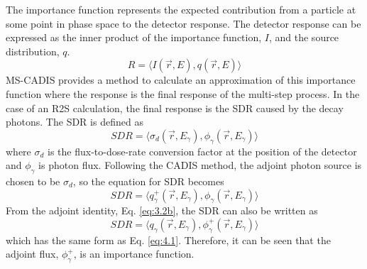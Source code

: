 The importance function represents the expected contribution from a particle 
at some point in phase space to the detector response.
The detector response can be
expressed as the inner product of the importance function, $I$, and the source
distribution, $q$.
\begin{equation} \label{eq:4.1}
R = %
    \langle I(\overrightarrow{r}, E), 
    q(\overrightarrow{r}, E) \rangle
\end{equation}
MS-CADIS provides a method to calculate an
 approximation 
of this importance function
where the response is the final response of the multi-step process.  In the case
of an R2S calculation, the final response is the SDR caused by the decay
photons.  The SDR is defined as 
\begin{equation} \label{eq:4.2}
  SDR =  \langle \sigma_{d}(\overrightarrow{r},E_{\gamma}),
  \phi_{\gamma}(\overrightarrow{r}, E_{\gamma}) \rangle
\end{equation}
where $\sigma_{d}$ is the flux-to-dose-rate conversion factor at the position of
the detector and $\phi_{\gamma}$ is photon flux.
Following the CADIS method, the adjoint photon source is chosen to be $\sigma_d$,
so the equation for SDR becomes 
\begin{equation} \label{eq:4.2.1}
	SDR =  \langle q_{\gamma}^{+}(\overrightarrow{r},E_{\gamma}),
                       \phi_{\gamma}(\overrightarrow{r}, E_{\gamma}) \rangle 
\end{equation}
From the adjoint identity, Eq. \ref{eq:3.2b}, the SDR can also be written as 
\begin{equation} \label{eq:4.3}
	SDR =
	\langle q_{\gamma}(\overrightarrow{r},E_{\gamma}),
  \phi_{\gamma}^{+}(\overrightarrow{r}, E_{\gamma}) \rangle 
\end{equation}
which has the same form as Eq. \ref{eq:4.1}.  Therefore, it can be seen that 
the adjoint flux, $\phi_{\gamma}^+$, is an importance function.

